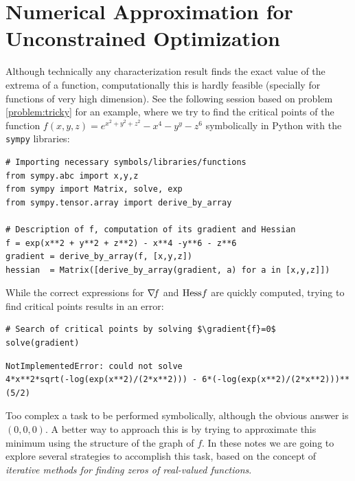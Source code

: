 
\chapter{Numerical Approximation for Unconstrained Optimization}\label{chapter:nonlinearoptimization}
Although technically any characterization result finds the exact value of the extrema of a function, computationally this is hardly feasible (specially for functions of very high dimension).  See the following session based on problem \ref{problem:tricky} for an example, where we try to find the critical points of the function $f(x,y,z)=e^{x^2+y^2+z^2}-x^4-y^y-z^6$ symbolically in Python with the \texttt{sympy} libraries:

\begin{verbatim}
# Importing necessary symbols/libraries/functions
from sympy.abc import x,y,z
from sympy import Matrix, solve, exp
from sympy.tensor.array import derive_by_array

# Description of f, computation of its gradient and Hessian
f = exp(x**2 + y**2 + z**2) - x**4 -y**6 - z**6
gradient = derive_by_array(f, [x,y,z])
hessian  = Matrix([derive_by_array(gradient, a) for a in [x,y,z]])
\end{verbatim}
While the correct expressions for $\mathop{\nabla\! {f}}$ and $\mathop{\mathrm{Hess}{f}}$ are quickly computed, trying to find critical points results in an error:
\begin{verbatim}
# Search of critical points by solving $\gradient{f}=0$
solve(gradient)
\end{verbatim}

\begin{verbatim}
NotImplementedError: could not solve 
4*x**2*sqrt(-log(exp(x**2)/(2*x**2))) - 6*(-log(exp(x**2)/(2*x**2)))**(5/2)
\end{verbatim}

Too complex a task to be performed symbolically, although the obvious answer is $(0,0,0)$.  A better way to approach this is by trying to approximate this minimum using the structure of the graph of $f$.  In these notes we are going to explore several strategies to accomplish this task, based on the concept of \emph{iterative methods for finding zeros of real-valued functions}.

